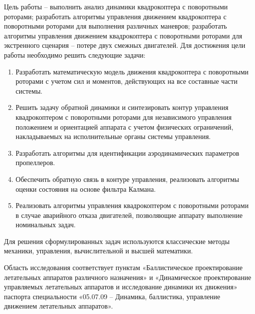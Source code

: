 Цель работы -- выполнить анализ динамики квадрокоптера с поворотными роторами;
разработать алгоритмы управления движением квадрокоптера с поворотными роторами для выполнения различных маневров; разработать алгоритмы управления движением квадрокоптера с поворотными роторами для экстренного сценария -- потере двух смежных двигателей. Для достижения цели работы необходимо решить следующие задачи:
\begin{enumerate}
	\item Разработать математическую модель движения квадрокоптера с поворотными роторами с учетом сил и моментов, действующих на все составные части системы.
	\item Решить задачу обратной динамики и синтезировать контур управления квадрокоптером с поворотными роторами для независимого управления положением и ориентацией аппарата с учетом физических ограничений, накладываемых на исполнительные органы системы управления.
	\item Разработать алгоритмы для идентификации аэродинамических параметров пропеллеров.
	\item Обеспечить обратную связь в контуре управления, реализовать алгоритмы оценки состояния на основе фильтра Калмана.
	\item Реализовать алгоритмы управления квадрокоптером с поворотными роторами в случае аварийного отказа  двигателей, позволяющие аппарату выполнение номинальных задач.
\end{enumerate}
Для решения сформулированных задач используются классические методы механики, управления, вычислительной и высшей математики.

Область исследования соответствует пунктам «Баллистическое проектирование летательных аппаратов различного назначения» и «Динамическое проектирование управляемых летательных аппаратов и исследование динамики их движения» паспорта специальности «05.07.09 – Динамика, баллистика, управление движением летательных аппаратов».

